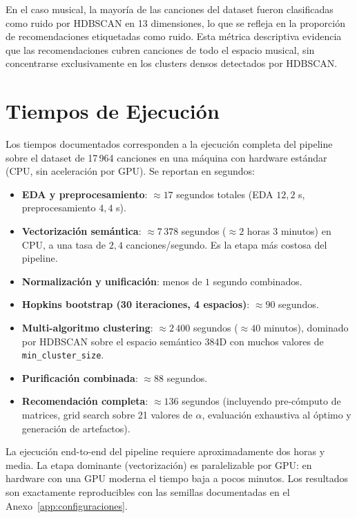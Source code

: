 En el caso musical, la mayoría de las canciones del dataset fueron clasificadas como ruido por HDBSCAN en 13 dimensiones, lo que se refleja en la proporción de recomendaciones etiquetadas como ruido. Esta métrica descriptiva evidencia que las recomendaciones cubren canciones de todo el espacio musical, sin concentrarse exclusivamente en los clusters densos detectados por HDBSCAN.

\section{Tiempos de Ejecución}
\label{sec:tiempos-ejecucion}

Los tiempos documentados corresponden a la ejecución completa del pipeline sobre el dataset de 17\,964 canciones en una máquina con hardware estándar (CPU, sin aceleración por GPU). Se reportan en segundos:

\begin{itemize}[leftmargin=2em]
    \item \textbf{EDA y preprocesamiento}: $\approx 17$ segundos totales (EDA $12{,}2$ s, preprocesamiento $4{,}4$ s).
    \item \textbf{Vectorización semántica}: $\approx 7\,378$ segundos ($\approx 2$ horas 3 minutos) en CPU, a una tasa de $2{,}4$ canciones/segundo. Es la etapa más costosa del pipeline.
    \item \textbf{Normalización y unificación}: menos de $1$ segundo combinados.
    \item \textbf{Hopkins bootstrap (30 iteraciones, 4 espacios)}: $\approx 90$ segundos.
    \item \textbf{Multi-algoritmo clustering}: $\approx 2\,400$ segundos ($\approx 40$ minutos), dominado por HDBSCAN sobre el espacio semántico 384D con muchos valores de \texttt{min\_cluster\_size}.
    \item \textbf{Purificación combinada}: $\approx 88$ segundos.
    \item \textbf{Recomendación completa}: $\approx 136$ segundos (incluyendo pre-cómputo de matrices, grid search sobre 21 valores de $\alpha$, evaluación exhaustiva al óptimo y generación de artefactos).
\end{itemize}

La ejecución end-to-end del pipeline requiere aproximadamente dos horas y media. La etapa dominante (vectorización) es paralelizable por GPU: en hardware con una GPU moderna el tiempo baja a pocos minutos. Los resultados son exactamente reproducibles con las semillas documentadas en el Anexo~\ref{app:configuraciones}.
